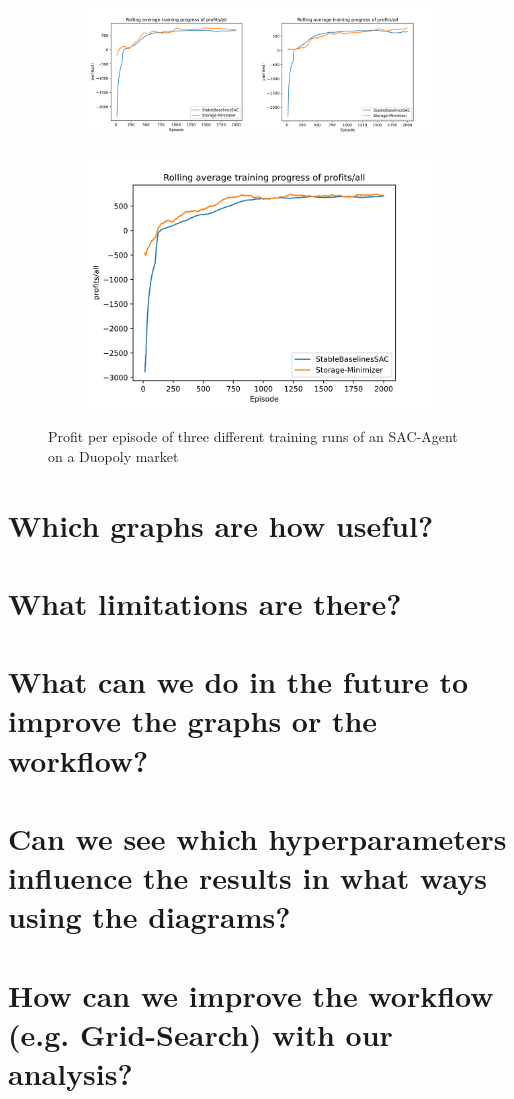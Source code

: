 \begin{figure}[ht]
	\begin{subfigure}{\textwidth}
		\centering
		\includegraphics[width = \textwidth]{images/experiments/SACDuopoly/SACDuopolyProfits1_2.pdf}\\[1 ex]
	\end{subfigure}
	\begin{subfigure}{\textwidth}
		\centering
		\includegraphics[width = .5\textwidth]{images/experiments/SACDuopoly/SACDuopolyProfits3.pdf}\\[1 ex]
	\end{subfigure}
	\caption{Profit per episode of three different training runs of an SAC-Agent on a Duopoly market}\label{fig:SACDuopolyProfits}
\end{figure}

\section*{Which graphs are how useful?}
\section*{What limitations are there?}
\section*{What can we do in the future to improve the graphs or the workflow?}
\section*{Can we see which hyperparameters influence the results in what ways using the diagrams?}
\section*{How can we improve the workflow (e.g. Grid-Search) with our analysis?}

